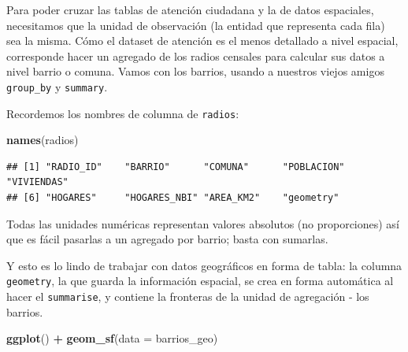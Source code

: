 \documentclass[]{book}
\newenvironment{Shaded}{\begin{snugshade}}{\end{snugshade}}
\newcommand{\KeywordTok}[1]{\textcolor[rgb]{0.13,0.29,0.53}{\textbf{#1}}}
\newcommand{\DataTypeTok}[1]{\textcolor[rgb]{0.13,0.29,0.53}{#1}}
\newcommand{\StringTok}[1]{\textcolor[rgb]{0.31,0.60,0.02}{#1}}
\newcommand{\OperatorTok}[1]{\textcolor[rgb]{0.81,0.36,0.00}{\textbf{#1}}}
\newcommand{\NormalTok}[1]{#1}
\begin{document}
Para poder cruzar las tablas de atención ciudadana y la de datos
espaciales, necesitamos que la unidad de observación (la entidad que
representa cada fila) sea la misma. Cómo el dataset de atención es el
menos detallado a nivel espacial, corresponde hacer un agregado de los
radios censales para calcular sus datos a nivel barrio o comuna. Vamos
con los barrios, usando a nuestros viejos amigos \texttt{group\_by} y
\texttt{summary}.

Recordemos los nombres de columna de \texttt{radios}:

\begin{Shaded}
\begin{Highlighting}[]
\KeywordTok{names}\NormalTok{(radios)}
\end{Highlighting}
\end{Shaded}

\begin{verbatim}
## [1] "RADIO_ID"    "BARRIO"      "COMUNA"      "POBLACION"   "VIVIENDAS"  
## [6] "HOGARES"     "HOGARES_NBI" "AREA_KM2"    "geometry"
\end{verbatim}

Todas las unidades numéricas representan valores absolutos (no
proporciones) así que es fácil pasarlas a un agregado por barrio; basta
con sumarlas.

\begin{Shaded}
\end{Shaded}

Y esto es lo lindo de trabajar con datos geográficos en forma de tabla:
la columna \texttt{geometry}, la que guarda la información espacial, se
crea en forma automática al hacer el \texttt{summarise}, y contiene la
fronteras de la unidad de agregación - los barrios.

\begin{Shaded}
\begin{Highlighting}[]
\KeywordTok{ggplot}\NormalTok{() }\OperatorTok{+}\StringTok{ }\KeywordTok{geom_sf}\NormalTok{(}\DataTypeTok{data =}\NormalTok{ barrios_geo)}
\end{Highlighting}
\end{Shaded}
\end{document}
